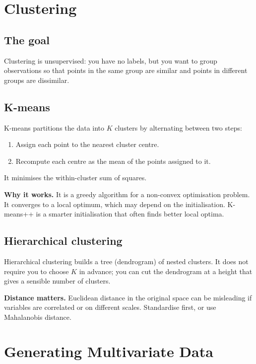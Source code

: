 \documentclass[11pt,a4paper]{article}
\begin{document}
\section{Clustering}

\subsection{The goal}
Clustering is unsupervised: you have no labels, but you want to group
observations so that points in the same group are similar and points
in different groups are dissimilar.

\subsection{K-means}
K-means partitions the data into $K$ clusters by alternating between
two steps:
\begin{enumerate}
    \item Assign each point to the nearest cluster centre.
    \item Recompute each centre as the mean of the points assigned to it.
\end{enumerate}
It minimises the within-cluster sum of squares.

\textbf{Why it works.}  It is a greedy algorithm for a non-convex
optimisation problem.  It converges to a local optimum, which may
depend on the initialisation.  K-means++ is a smarter initialisation
that often finds better local optima.

\subsection{Hierarchical clustering}
Hierarchical clustering builds a tree (dendrogram) of nested clusters.
It does not require you to choose $K$ in advance; you can cut the
dendrogram at a height that gives a sensible number of clusters.

\textbf{Distance matters.}  Euclidean distance in the original space
can be misleading if variables are correlated or on different scales.
Standardise first, or use Mahalanobis distance.

\section{Generating Multivariate Data}
\end{document}
